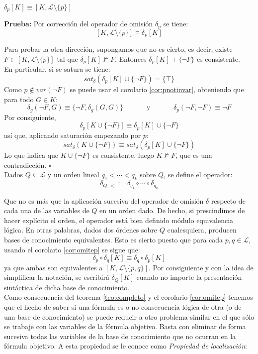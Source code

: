 \cor \label{cor:omitep} $\delta_p [K] \equiv [K, \mathcal{L} \setminus \{ p \}]$

\noindent \textbf{Prueba:} Por corrección del operador de omisión $\delta_p$ se tiene:
$$[K, \mathcal{L} \setminus \{ p \}] \vDash \delta_p [K]$$

Para probar la otra dirección, supongamos que no es cierto, es decir, existe \\ $F\in [K, \mathcal{L} \setminus \{ p \}]$ tal que $\delta_p [K] \nvDash F$. Entonces $\delta_p [K] + \{ \neg F \}$ es consistente. \\ En particular, si se satura se tiene: 
$$sat_{\delta}(\delta_p [K] \cup \{ \neg F \}) = \{ \top \}$$
Como $p \notin var(\neg F)$ se puede usar el corolario \ref{cor:pnotinvar}, obteniendo que para todo $G\in K$:
$$\delta_g (\neg F, G) \equiv \{ \neg F, \delta_g  (G,G)  \} \;\;\;\;\;\;\;\;\;\;\;\; \text{y} \;\;\;\;\;\;\;\;\;\;\;\; \delta_p (\neg F , \neg F) \equiv \neg F$$
Por consiguiente,
$$\delta_p [K \cup \{ \neg F \}] \equiv \delta_p [K] \cup \{ \neg F \}$$
así que, aplicando saturación empezando por $p$:
$$sat_{\delta}(K \cup \{ \neg F \}) \equiv sat_{\delta}(\delta_p [K] \cup \{ \neg F \})$$
Lo que indica que $K \cup \{ \neg F \}$ es consistente, luego $K \nvDash F$, que es una contradicción. $\square$\\

Dados $Q \subseteq \mathcal{L}$ y un orden lineal $q_1 < \cdots < q_k$ sobre $Q$, se define el operador: $$\delta_{Q,<} := \delta_{q_1} \circ \cdots \circ \delta_{q_k}$$

Que no es más que la aplicación sucesiva del operador de omisión $\delta$ respecto de cada una de las variables de $Q$ en un orden dado. De hecho, si prescindimos de hacer explícito el orden, el operador está bien definido módulo equivalencia lógica. En otras palabras, dados dos órdenes sobre $Q$ cualesquiera, producen bases de conocimiento equivalentes. Esto es cierto puesto que para cada $p,q \in \mathcal{L}$, usando el corolario \ref{cor:omitep} se sigue que:
$$ \delta_p \circ \delta_q [K] \equiv \delta_q \circ \delta_p [K]$$
\noindent ya que ambas son equivalentes a $[K, \mathcal{L} \setminus \{ p,q \}]$. Por consiguiente y con la idea de simplificar la notación, se escribirá $\delta_Q [K]$ cuando no importe la presentación sintáctica de dicha base de conocimiento.\\

Como consecuencia del teorema \ref{teo:completo} y el corolario \ref{cor:omitep} tenemos que el hecho de saber si una fórmula es o no consecuencia lógica de otra (o de una base de conocimiento) se puede reducir a otro problema similar en el que sólo se trabaje con las variables de la fórmula objetivo. Basta con eliminar de forma sucesiva todas las variables de la base de conocimiento que no ocurran en la fórmula objetivo. A esta propiedad se le conoce como \textit{Propiedad de localización}:

